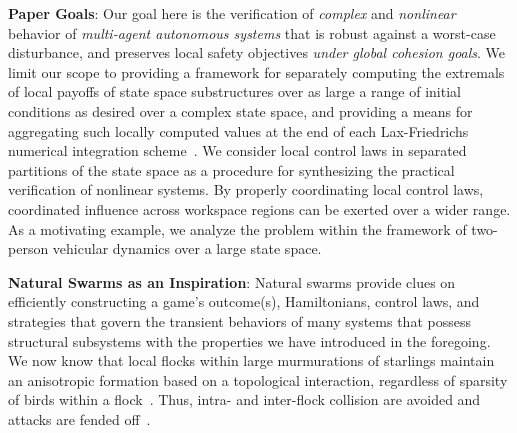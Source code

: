 \textbf{Paper Goals}: Our goal here is the verification of  \textit{complex} and \textit{nonlinear} behavior of  \textit{multi-agent autonomous systems} that is robust against a worst-case disturbance, and preserves local safety objectives \textit{under global cohesion goals}. We limit our scope to providing a framework for separately computing the extremals of local payoffs of state space substructures over as large a range of initial conditions as desired over a complex state space,   and providing a means for aggregating such locally computed values at the end of each Lax-Friedrichs numerical integration scheme~\cite{Crandall1984Approx, OsherShuENO}. 
We consider local control laws in separated partitions of the state space as a procedure for synthesizing the practical verification of nonlinear systems. By properly coordinating local control laws, coordinated influence across workspace regions can be exerted over a wider range. 
As a motivating example, we analyze the problem within the framework of two-person vehicular dynamics over a large state space.  

\textbf{Natural Swarms as an Inspiration}: 
Natural swarms provide clues on efficiently constructing a game's outcome(s), Hamiltonians, control laws, and strategies that govern the transient behaviors of many systems that possess structural subsystems with the properties we have introduced in the foregoing. We now know that local flocks within large murmurations of starlings maintain an anisotropic formation based on a topological interaction, regardless of sparsity of birds within a flock~\cite{Cavagna2010Scale}. Thus, intra- and inter-flock collision are avoided and attacks are fended off~\cite{Ballerini1232}.
 



